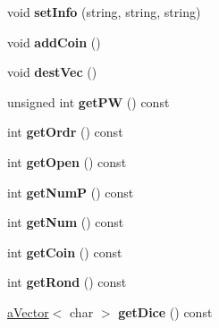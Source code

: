 \begin{DoxyCompactItemize}
\item 
\hypertarget{class_player_a433926989957da76385fbc37e732bcf0}{}void {\bfseries set\+Info} (string, string, string)\label{class_player_a433926989957da76385fbc37e732bcf0}

\item 
\hypertarget{class_player_abe9f17c654709de1a7afacc7efedfd7e}{}void {\bfseries add\+Coin} ()\label{class_player_abe9f17c654709de1a7afacc7efedfd7e}

\item 
\hypertarget{class_player_a36d5a5057ee3f62702aaa78809973503}{}void {\bfseries dest\+Vec} ()\label{class_player_a36d5a5057ee3f62702aaa78809973503}

\item 
\hypertarget{class_player_aaa79bb23e3f6f193d101d49ec3f1b36b}{}unsigned int {\bfseries get\+P\+W} () const \label{class_player_aaa79bb23e3f6f193d101d49ec3f1b36b}

\item 
\hypertarget{class_player_a77a2e63cfed717ce18b978b1cb89b1e0}{}int {\bfseries get\+Ordr} () const \label{class_player_a77a2e63cfed717ce18b978b1cb89b1e0}

\item 
\hypertarget{class_player_ab7164df826d0d2048fe653ca699f50d2}{}int {\bfseries get\+Open} () const \label{class_player_ab7164df826d0d2048fe653ca699f50d2}

\item 
\hypertarget{class_player_a5380a48bc89f9624405632be0d4188ab}{}int {\bfseries get\+Num\+P} () const \label{class_player_a5380a48bc89f9624405632be0d4188ab}

\item 
\hypertarget{class_player_a98dc67318971c5063fa9ef58b67040ef}{}int {\bfseries get\+Num} () const \label{class_player_a98dc67318971c5063fa9ef58b67040ef}

\item 
\hypertarget{class_player_ac24ac3e4bf79639ac4823684685acc4b}{}int {\bfseries get\+Coin} () const \label{class_player_ac24ac3e4bf79639ac4823684685acc4b}

\item 
\hypertarget{class_player_ae9edaa4238cee3014ee20758da46f39f}{}int {\bfseries get\+Rond} () const \label{class_player_ae9edaa4238cee3014ee20758da46f39f}

\item 
\hypertarget{class_player_aa2530cc97759ae72f7b21e127d042f66}{}\hyperlink{classa_vector}{a\+Vector}$<$ char $>$ {\bfseries get\+Dice} () const \label{class_player_aa2530cc97759ae72f7b21e127d042f66}


\end{DoxyCompactItemize}
